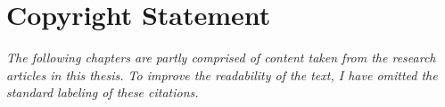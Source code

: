 \documentclass[10pt, twoside, a4paper, hidelinks]{report}
\begin{document}


\setcounter{tocdepth}{2}




\fancyhead{}
\fancyhead[L]{\leftmark}
\fancyhead[RE]{\rightmark}
\fancyhead[LO,RE]{\thepage}
\fancyfoot{}



\renewcommand{\contentsname}{Table of Contents}
\tableofcontents
\clearpage

\listoffigures
\clearpage

\listoftables
\vfill
\section*{Copyright Statement}

\textit{The following chapters are partly comprised of content taken from the research articles in this thesis. 
To improve the readability of the text, I have omitted the standard labeling of these citations.}
\clearpage


\setlength{\parskip}{0.5em} 

\clearpage
{}  
\setcounter{page}{1}


\clearpage


\clearpage


\clearpage

\clearpage

\clearpage

\printbibliography[notcategory=ignore,heading=bibintoc]
\newpage



\clearpage


\end{document}
